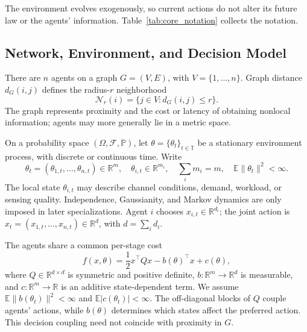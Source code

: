 \documentclass[11pt]{article}
\begin{document}
The environment evolves exogenously, so current actions do not alter its future
law or the agents' information. Table~\ref{tab:core_notation} collects the notation.

\subsection{Network, Environment, and Decision Model}
\label{subsec:decision_model}

There are $n$ agents on a graph $G=(V,E)$, with $V=\{1,\ldots,n\}$.
Graph distance $d_G(i,j)$ defines the radius-$r$ neighborhood
\begin{equation}
\mathcal N_r(i)=\{j\in V:d_G(i,j)\le r\}.
\label{eq:r_neighborhood}
\end{equation}
The graph represents proximity and the cost or latency of obtaining nonlocal
information; agents may more generally lie in a metric space.

On a probability space $(\Omega,\mathcal F,\mathbb P)$, let
$\theta=\{\theta_t\}_{t\in\mathbb T}$ be a stationary environment process,
with discrete or continuous time. Write
\begin{equation}
\theta_t=(\theta_{1,t},\ldots,\theta_{n,t})\in\mathbb R^m,
\quad \theta_{i,t}\in\mathbb R^{m_i},\quad \sum_i m_i=m,
\quad \mathbb E\|\theta_t\|^2<\infty.
\label{eq:state_partition}
\end{equation}
The local state $\theta_{i,t}$ may describe channel conditions, demand,
workload, or sensing quality. Independence, Gaussianity, and Markov dynamics
are only imposed in later specializations. Agent $i$ chooses
$x_{i,t}\in\mathbb R^{d_i}$; the joint action is
$x_t=(x_{1,t},\ldots,x_{n,t})\in\mathbb R^d$, with $d=\sum_i d_i$.

The agents share a common per-stage cost
\begin{equation}
    f(x,\theta)
    =
    \frac{1}{2}x^\top Qx
    -
    b(\theta)^\top x
    +
    c(\theta),
    \label{eq:quadratic_cost}
\end{equation}
where $Q\in\mathbb{R}^{d\times d}$ is symmetric and positive definite,
$b:\mathbb{R}^{m}\rightarrow\mathbb{R}^{d}$ is measurable, and
$c:\mathbb{R}^{m}\rightarrow\mathbb{R}$ is an additive state-dependent term.
We assume $\mathbb E\|b(\theta_t)\|^2<\infty$ and
$\mathbb E|c(\theta_t)|<\infty$. The off-diagonal blocks of $Q$ couple agents'
actions, while $b(\theta)$ determines which states affect the preferred action.
This decision coupling need not coincide with proximity in $G$.
\end{document}
